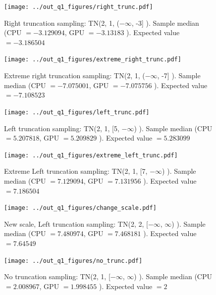 \documentclass[11pt]{amsart}
\begin{document}
\begin{figure}[htbp] %
   \centering
   \texttt{[image: ../out\_q1\_figures/right\_trunc.pdf]} 
   \caption{Right truncation sampling:  TN\Big (2, 1, ($-\infty$, -3] \Big ). Sample median (CPU $= -3.129094$, GPU $= -3.13183  $ ). Expected value $= -3.186504$ } 
   \label{fig:right}
\end{figure}


\begin{figure}[htbp] %
   \centering
   \texttt{[image: ../out\_q1\_figures/extreme\_right\_trunc.pdf]} 
   \caption{Extreme right truncation sampling:  TN\Big (2, 1, ($-\infty$, -7] \Big ). Sample median (CPU $= -7.075001$, GPU $= -7.075756 $ ). Expected value $=  -7.108523$ } 
   \label{fig:extright}
\end{figure}

\begin{figure}[htbp] %
   \centering
   \texttt{[image: ../out\_q1\_figures/left\_trunc.pdf]} 
   \caption{Left  truncation sampling:  TN\Big (2, 1, [5, $-\infty$) \Big ). Sample median (CPU $= 5.207818$, GPU $=5.209829 $ ). Expected value $= 5.283099$ } 
   \label{fig:ltrunc}
\end{figure}

\begin{figure}[htbp] %
   \centering
   \texttt{[image: ../out\_q1\_figures/extreme\_left\_trunc.pdf]} 
   \caption{Extreme Left  truncation sampling:  TN\Big (2, 1, [7, $-\infty$) \Big ). Sample median (CPU $= 7.129094$, GPU $=  7.131956$ ). Expected value $=  7.186504$ } 
   \label{fig:eltrunc}
\end{figure}


\begin{figure}[htbp] %
   \centering
   \texttt{[image: ../out\_q1\_figures/change\_scale.pdf]} 
   \caption{New scale, Left truncation sampling:  TN\Big (2, 2, [$-\infty$, $\infty$) \Big ). Sample median (CPU $= 7.480974 $, GPU $=7.468181  $ ). Expected value $= 7.64549$ } 
   \label{fig:newscaletrunc}
\end{figure}


\begin{figure}[htbp] %
   \centering
   \texttt{[image: ../out\_q1\_figures/no\_trunc.pdf]} 
   \caption{No truncation sampling:  TN\Big (2, 1, [$-\infty$, $\infty$) \Big ). Sample median (CPU $= 2.008967$, GPU $=1.998455 $ ). Expected value $= 2$ } 
   \label{fig:notrunc}
\end{figure}
\end{document}
